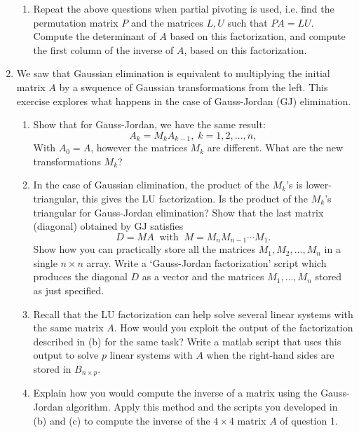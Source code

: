 \documentclass[11pt]{article}
\begin{document}
\begin{enumerate}
\begin{enumerate}
		      \item Repeat the above questions when partial pivoting is used, i.e. find the permutation matrix \(P\) and the matrices \(L,U\) such that \(PA = LU\).  Compute the determinant of \(A\) based on this factorization, and compute the first column of the inverse of \(A\), based on this factorization.
	      \end{enumerate}

	\item We saw that Gaussian elimination is equivalent to multiplying the initial matrix \(A\) by a swquence of Gaussian transformations from the left.  This exercise explores what happens in the case of Gauss-Jordan (GJ) elimination.
	      \begin{enumerate}
		      \item Show that for Gauss-Jordan, we have the same result:
		            \[A_k = M_kA_{k-1}, \; k = 1, 2, \dots, n,\]
		            With \(A_0 = A\), however the matrices \(M_k\) are different.  What are the new transformations \(M_k\)?

		      \item In the case of Gaussian elimination, the product of the \(M_k\)'s is lower-triangular, this gives the LU factorization.  Is the product of the \(M_k\)'s triangular for Gauss-Jordan elimination?  Show that the last matrix (diagonal) obtained by GJ satisfies
		            \[D = MA \;\; \text{with} \;\; M = M_n M_{n-1} \cdots M_1.\]
		            Show how you can practically store all the matrices \(M_1, M_2, \dots, M_n\) in a single \(n \times n\) array.  Write a `Gauss-Jordan factorization' script which produces the diagonal \(D\) as a vector and the matrices \(M_1, \dots, M_n\) stored as just specified.

		      \item Recall that the LU factorization can help solve several linear systems with the same matrix \(A\).  How would you exploit the output of the factorization described in (b) for the same task?  Write a matlab script that uses this output to solve \(p\) linear systems with \(A\) when the right-hand sides are stored in \(B_{n \times p}\).

		      \item Explain how you would compute the inverse of a matrix using the Gauss-Jordan algorithm.  Apply this method and the scripts you developed in (b) and (c) to compute the inverse of the \(4 \times 4\) matrix \(A\) of question 1.
	      \end{enumerate}


\end{enumerate}
\end{document}
